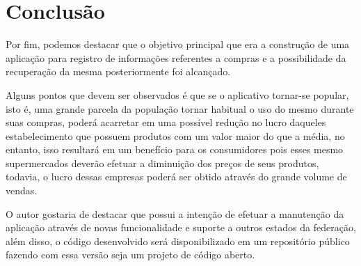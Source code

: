 \chapter{Conclusão}

Por fim, podemos destacar que o objetivo principal que era a construção de uma aplicação para registro de informações referentes a compras e a possibilidade da recuperação da mesma posteriormente foi alcançado.

Alguns pontos que devem ser observados é que se o aplicativo tornar-se popular, isto é, uma grande parcela da população tornar habitual o uso do mesmo durante suas compras, poderá acarretar em uma possível redução no lucro daqueles estabelecimento que possuem produtos com um valor maior do que a média, no entanto, isso resultará em um benefício para os consumidores pois esses mesmo supermercados deverão efetuar a diminuição dos preços de seus produtos, todavia, o lucro dessas empresas poderá ser obtido através do grande volume de vendas.

O autor gostaria de destacar que possui a intenção de efetuar a manutenção da aplicação através de novas funcionalidade e suporte a outros estados da federação, além disso, o código desenvolvido será disponibilizado em um repositório público fazendo com essa versão seja um projeto de código aberto.